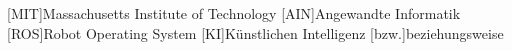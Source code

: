 
\begin{acronym}[ROS]
	[MIT]{Massachusetts Institute of Technology}
	[AIN]{Angewandte Informatik}
	[ROS]{Robot Operating System}
	[KI]{Künstlichen Intelligenz}
	[bzw.]{beziehungsweise}
\end{acronym}
